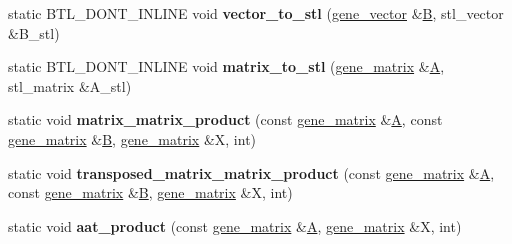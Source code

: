 \begin{DoxyCompactItemize}
static B\+T\+L\+\_\+\+D\+O\+N\+T\+\_\+\+I\+N\+L\+I\+NE void {\bfseries vector\+\_\+to\+\_\+stl} (\hyperlink{group___core___module_class_eigen_1_1_matrix}{gene\+\_\+vector} \&\hyperlink{group___core___module_class_eigen_1_1_matrix}{B}, stl\+\_\+vector \&B\+\_\+stl)
\item 
\mbox{\label{classeigen3__interface_a1ea18848f5c77b724e3f8482749dba5a}} 
static B\+T\+L\+\_\+\+D\+O\+N\+T\+\_\+\+I\+N\+L\+I\+NE void {\bfseries matrix\+\_\+to\+\_\+stl} (\hyperlink{group___core___module_class_eigen_1_1_matrix}{gene\+\_\+matrix} \&\hyperlink{group___core___module_class_eigen_1_1_matrix}{A}, stl\+\_\+matrix \&A\+\_\+stl)
\item 
\mbox{\label{classeigen3__interface_a587bfaf9e3c5b329bd8805b07fbdef7f}} 
static void {\bfseries matrix\+\_\+matrix\+\_\+product} (const \hyperlink{group___core___module_class_eigen_1_1_matrix}{gene\+\_\+matrix} \&\hyperlink{group___core___module_class_eigen_1_1_matrix}{A}, const \hyperlink{group___core___module_class_eigen_1_1_matrix}{gene\+\_\+matrix} \&\hyperlink{group___core___module_class_eigen_1_1_matrix}{B}, \hyperlink{group___core___module_class_eigen_1_1_matrix}{gene\+\_\+matrix} \&X, int)
\item 
\mbox{\label{classeigen3__interface_aace9786088c23d20fe54da2a6f2fcab5}} 
static void {\bfseries transposed\+\_\+matrix\+\_\+matrix\+\_\+product} (const \hyperlink{group___core___module_class_eigen_1_1_matrix}{gene\+\_\+matrix} \&\hyperlink{group___core___module_class_eigen_1_1_matrix}{A}, const \hyperlink{group___core___module_class_eigen_1_1_matrix}{gene\+\_\+matrix} \&\hyperlink{group___core___module_class_eigen_1_1_matrix}{B}, \hyperlink{group___core___module_class_eigen_1_1_matrix}{gene\+\_\+matrix} \&X, int)
\item 
\mbox{\label{classeigen3__interface_ae17740e993b1c0e6228433d49eda6e0d}} 
static void {\bfseries aat\+\_\+product} (const \hyperlink{group___core___module_class_eigen_1_1_matrix}{gene\+\_\+matrix} \&\hyperlink{group___core___module_class_eigen_1_1_matrix}{A}, \hyperlink{group___core___module_class_eigen_1_1_matrix}{gene\+\_\+matrix} \&X, int)
\item 
\mbox{\label{classeigen3__interface_ac6b34299d6470309cc1ce39d827bc3dc}} 

\end{DoxyCompactItemize}
